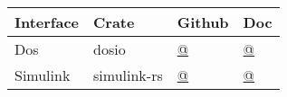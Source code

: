\begin{longtable}[]{@{}llll@{}}
  \toprule
  Interface & Crate & Github & Doc\tabularnewline
  \midrule
  \endhead
  Dos & dosio &   \href{https://github.com/rconan/dosio}{@}
  & \href{https://rconan.github.io/dosio}{@} \tabularnewline
  Simulink & simulink-rs & \href{https://github.com/rconan/simulink-rs}{@}&
  \href{https://rconan.github.io/simulink-rs}{@} \tabularnewline
  \bottomrule
\end{longtable}
